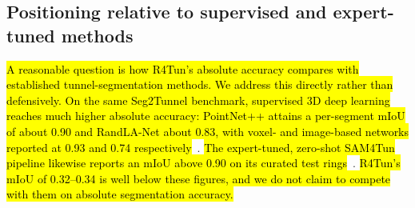 %
%

\subsection{Positioning relative to supervised and expert-tuned methods}\label{sec:positioning}

\hl{A reasonable question is how R4Tun's absolute accuracy compares with established tunnel-segmentation methods. We address this directly rather than defensively. On the same Seg2Tunnel benchmark, supervised 3D deep learning reaches much higher absolute accuracy: PointNet++ attains a per-segment mIoU of about 0.90 and RandLA-Net about 0.83, with voxel- and image-based networks reported at 0.93 and 0.74 respectively}~. \hl{The expert-tuned, zero-shot SAM4Tun pipeline likewise reports an mIoU above 0.90 on its curated test rings}~. \hl{R4Tun's mIoU of 0.32--0.34 is well below these figures, and we do not claim to compete with them on absolute segmentation accuracy.}

